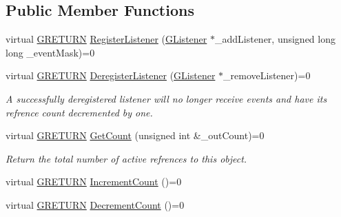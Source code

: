 \subsection*{Public Member Functions}
\begin{DoxyCompactItemize}
\item 
virtual \hyperlink{namespace_g_w_a69b1aaebac1cac8049825f035884c95b}{G\+R\+E\+T\+U\+RN} \hyperlink{class_g_w_1_1_c_o_r_e_1_1_g_broadcasting_a7411c69b20257c02791bccc92cb0fd2b}{Register\+Listener} (\hyperlink{class_g_w_1_1_c_o_r_e_1_1_g_listener}{G\+Listener} $\ast$\+\_\+add\+Listener, unsigned long long \+\_\+event\+Mask)=0
\item 
\hypertarget{class_g_w_1_1_c_o_r_e_1_1_g_broadcasting_a582f9f7b9311023dd1f00db49c16e80e}{}\label{class_g_w_1_1_c_o_r_e_1_1_g_broadcasting_a582f9f7b9311023dd1f00db49c16e80e} 
virtual \hyperlink{namespace_g_w_a69b1aaebac1cac8049825f035884c95b}{G\+R\+E\+T\+U\+RN} \hyperlink{class_g_w_1_1_c_o_r_e_1_1_g_broadcasting_a582f9f7b9311023dd1f00db49c16e80e}{Deregister\+Listener} (\hyperlink{class_g_w_1_1_c_o_r_e_1_1_g_listener}{G\+Listener} $\ast$\+\_\+remove\+Listener)=0
\begin{DoxyCompactList}\small\item\em A successfully deregistered listener will no longer receive events and have it\textquotesingle{}s refrence count decremented by one. \end{DoxyCompactList}\item 
\hypertarget{class_g_w_1_1_c_o_r_e_1_1_g_interface_a80f212dcdf60202cf9da49405863d1d5}{}\label{class_g_w_1_1_c_o_r_e_1_1_g_interface_a80f212dcdf60202cf9da49405863d1d5} 
virtual \hyperlink{namespace_g_w_a69b1aaebac1cac8049825f035884c95b}{G\+R\+E\+T\+U\+RN} \hyperlink{class_g_w_1_1_c_o_r_e_1_1_g_interface_a80f212dcdf60202cf9da49405863d1d5}{Get\+Count} (unsigned int \&\+\_\+out\+Count)=0
\begin{DoxyCompactList}\small\item\em Return the total number of active refrences to this object. \end{DoxyCompactList}\item 
virtual \hyperlink{namespace_g_w_a69b1aaebac1cac8049825f035884c95b}{G\+R\+E\+T\+U\+RN} \hyperlink{class_g_w_1_1_c_o_r_e_1_1_g_interface_a3e04e58eef4f3e3f56ff7fb751194c37}{Increment\+Count} ()=0
\item 
virtual \hyperlink{namespace_g_w_a69b1aaebac1cac8049825f035884c95b}{G\+R\+E\+T\+U\+RN} \hyperlink{class_g_w_1_1_c_o_r_e_1_1_g_interface_af6924e12b14f217b518fc91c63d9703d}{Decrement\+Count} ()=0

\end{DoxyCompactItemize}
